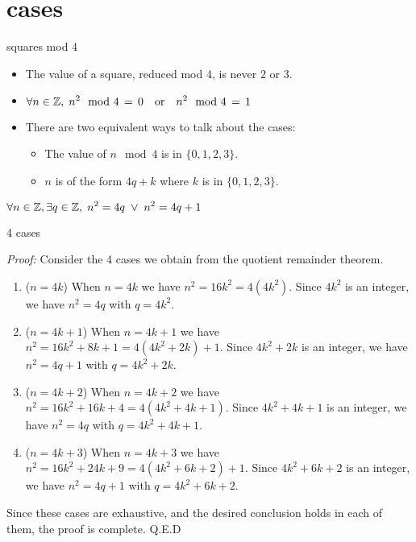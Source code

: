 \documentclass[landscape]{beamer}
\begin{document}
\section{cases}

\begin{frame}{squares mod 4}
\begin{itemize}
\item The value of a square, reduced mod 4, is never $2$ or $3$. \pause
\item $\displaystyle \forall n \in {\mathbb Z}, \; n^2 \mod 4 \, = \, 0 \quad \mbox{or} \quad n^2 \mod 4 \, = \, 1$ \pause
\item There are two equivalent ways to talk about the cases: \pause
\begin{itemize} 
\item The value of $n \mod 4$ is in $\{0,1,2,3\}$. \pause
\item $n$ is of the form $4q+k$ where $k$ is in $\{0,1,2,3\}$.\pause
\end{itemize}
\end{itemize}
\begin{thm*}
$\displaystyle \forall n \in {\mathbb Z}, \exists q \in {\mathbb Z}, \; n^2 = 4q \; \lor \; n^2 = 4q+1$
\end{thm*}

\end{frame}

\begin{frame}{4 cases}

{\em Proof:} Consider the 4 cases we obtain from the quotient remainder theorem. \pause
\begin{enumerate}
\item ($n=4k$) When $n=4k$ we have $n^2 = 16k^2 = 4(4k^2)$.  Since $4k^2$ is an integer, we have $n^2=4q$ with $q = 4k^2$. \pause
\item ($n=4k+1$) When $n=4k+1$ we have $n^2 = 16k^2 + 8k + 1 = 4(4k^2+2k) +1 $.  Since $4k^2+2k$ is an integer, we have $n^2=4q+1$ with $q = 4k^2+2k$. \pause
\item ($n=4k+2$) When $n=4k+2$ we have $n^2 = 16k^2 + 16k + 4 = 4(4k^2+4k+1) $.  Since $4k^2+4k+1$ is an integer, we have $n^2=4q$ with $q = 4k^2+4k+1$. \pause
\item ($n=4k+3$) When $n=4k+3$ we have $n^2 = 16k^2 + 24k + 9 = 4(4k^2+6k+2)+1 $.  Since $4k^2+6k+2$ is an integer, we have $n^2=4q+1$ with $q = 4k^2+6k+2$. \pause
\end{enumerate}
Since these cases are exhaustive, and the desired conclusion holds in each of them, the proof is complete.
\hfill Q.E.D

\end{frame}
\end{document}
